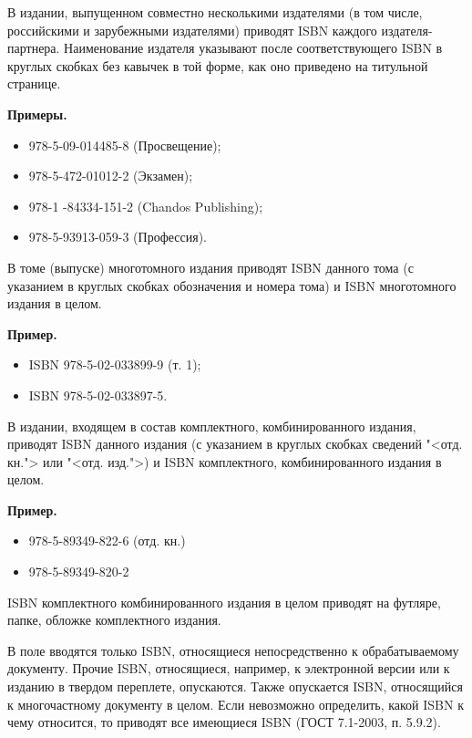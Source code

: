 В издании, выпущенном совместно несколькими издателями (в том числе, российскими и зарубежными издателями) приводят ISBN каждого издателя-партнера. Наименование издателя указывают после соответствующего ISBN в круглых скобках без кавычек в той форме, как оно приведено на титульной странице.

\textbf{Примеры.}

\begin{itemize}
	\item 978-5-09-014485-8 (Просвещение);
	\item 978-5-472-01012-2 (Экзамен);
	\item 978-1 -84334-151-2 (Chandos Publishing);
	\item 978-5-93913-059-3 (Профессия).
\end{itemize}

В томе (выпуске) многотомного издания приводят ISBN данного тома (с указанием в круглых скобках обозначения и номера тома) и ISBN многотомного издания в целом.

\textbf{Пример.}

\begin{itemize}
	\item ISBN 978-5-02-033899-9 (т. 1);
	\item ISBN 978-5-02-033897-5.
\end{itemize}

В издании, входящем в состав комплектного, комбинированного издания, приводят ISBN данного издания (с указанием в круглых скобках сведений "<отд. кн."> или "<отд. изд.">) и ISBN комплектного, комбинированного издания в целом.

\textbf{Пример.}

\begin{itemize}
	\item 978-5-89349-822-6 (отд. кн.)
	\item 978-5-89349-820-2
\end{itemize}

ISBN комплектного комбинированного издания в целом приводят на футляре, папке, обложке комплектного издания.

В поле вводятся только ISBN, относящиеся непосредственно к обрабатываемому документу. Прочие ISBN, относящиеся, например, к электронной версии или к изданию в твердом переплете, опускаются. Также опускается ISBN, относящийся к многочастному документу в целом.
Если невозможно определить, какой ISBN к чему относится, то приводят все имеющиеся ISBN (ГОСТ 7.1-2003, п. 5.9.2). %

